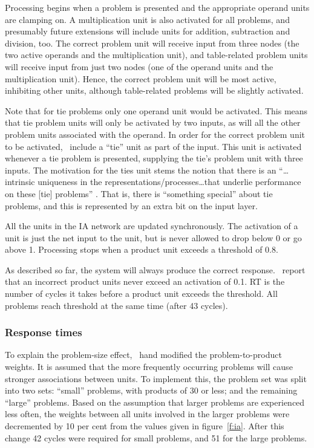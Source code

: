 Processing begins when a problem is presented and the appropriate operand
units are clamping on.  A multiplication unit is also activated for all
problems, and presumably future extensions will include
units for addition, subtraction and division, too. The correct problem unit
will receive input
from three nodes (the two active operands
and the multiplication unit), and
table-related problem units will receive input from just two nodes (one of
the operand units and the multiplication unit).  Hence, the correct problem
unit will be most active, inhibiting other units, although table-related
problems will be slightly activated.

Note that for tie problems only one operand unit would be activated. This
means that tie problem units will only be activated by two inputs, as will
all the other problem units associated with the operand.  In order for the
correct problem unit to be activated, \citeauthor{rickinte}\ include a
``tie'' unit as part of the input.  This unit is activated whenever a tie
problem is presented, supplying the tie's problem unit with three inputs.
The motivation for the ties unit stems the notion that there is an ``\ldots
intrinsic uniqueness in the representations/processes\ldots that underlie
performance on these [tie] problems'' \cite[p.~18]{rickinte}.  That is,
there is ``something special'' about tie problems, and this is represented
by an extra bit on the input layer.

All the units in the IA network are updated synchronously.  The activation
of a unit is just the net input to the unit, but is never allowed to drop
below 0 or go above 1. Processing stops when a product unit exceeds a
threshold of 0.8.

As described so far, the system will always produce the correct response.
\citeauthor{rickinte}\ report that an incorrect
product units never exceed an activation of 0.1.
RT is the number of cycles it takes before a product unit exceeds the
threshold.  All problems reach threshold at the same time (after 43
cycles).

\subsubsection{Response times}

To explain the problem-size effect, \citeauthor{rickinte}\ hand modified
the problem-to-product weights.  It is assumed that the more frequently
occurring problems will cause stronger associations between units. To
implement this,
the problem set was split into two sets: ``small'' problems,
with products of 30 or less; and the remaining ``large'' problems.  Based
on the assumption that larger problems are experienced less often, the
weights between all units involved in the larger problems were decremented
by 10 per cent from the values given in figure~\ref{f:ia}.  After this
change 42 cycles were required for small problems, and 51 for the large
problems.

